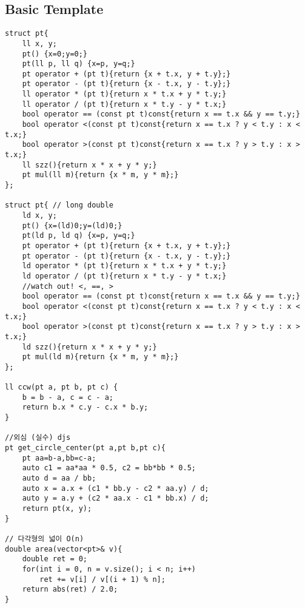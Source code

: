 \documentclass[landscape, 8pt, a4paper, oneside, twocolumn]{extarticle}
\begin{document}
\subsection{Basic Template}
\begin{verbatim}
struct pt{    
    ll x, y;
    pt() {x=0;y=0;}
    pt(ll p, ll q) {x=p, y=q;}
    pt operator + (pt t){return {x + t.x, y + t.y};}
    pt operator - (pt t){return {x - t.x, y - t.y};}
    ll operator * (pt t){return x * t.x + y * t.y;}
    ll operator / (pt t){return x * t.y - y * t.x;}
    bool operator == (const pt t)const{return x == t.x && y == t.y;}
    bool operator <(const pt t)const{return x == t.x ? y < t.y : x < t.x;}
    bool operator >(const pt t)const{return x == t.x ? y > t.y : x > t.x;}
    ll szz(){return x * x + y * y;}    
    pt mul(ll m){return {x * m, y * m};}
};

struct pt{ // long double
    ld x, y;
    pt() {x=(ld)0;y=(ld)0;}
    pt(ld p, ld q) {x=p, y=q;}
    pt operator + (pt t){return {x + t.x, y + t.y};}
    pt operator - (pt t){return {x - t.x, y - t.y};}
    ld operator * (pt t){return x * t.x + y * t.y;}
    ld operator / (pt t){return x * t.y - y * t.x;}
    //watch out! <, ==, >
    bool operator == (const pt t)const{return x == t.x && y == t.y;}
    bool operator <(const pt t)const{return x == t.x ? y < t.y : x < t.x;}
    bool operator >(const pt t)const{return x == t.x ? y > t.y : x > t.x;}
    ld szz(){return x * x + y * y;}    
    pt mul(ld m){return {x * m, y * m};}
};

ll ccw(pt a, pt b, pt c) {
    b = b - a, c = c - a;
    return b.x * c.y - c.x * b.y;
}

//외심 (실수) djs
pt get_circle_center(pt a,pt b,pt c){
	pt aa=b-a,bb=c-a;
	auto c1 = aa*aa * 0.5, c2 = bb*bb * 0.5;
    auto d = aa / bb;
    auto x = a.x + (c1 * bb.y - c2 * aa.y) / d;
    auto y = a.y + (c2 * aa.x - c1 * bb.x) / d;
    return pt(x, y);
}

// 다각형의 넓이 O(n)
double area(vector<pt>& v){
    double ret = 0;
    for(int i = 0, n = v.size(); i < n; i++)
        ret += v[i] / v[(i + 1) % n];
    return abs(ret) / 2.0;
}

\end{verbatim}
\newpage
\end{document}
